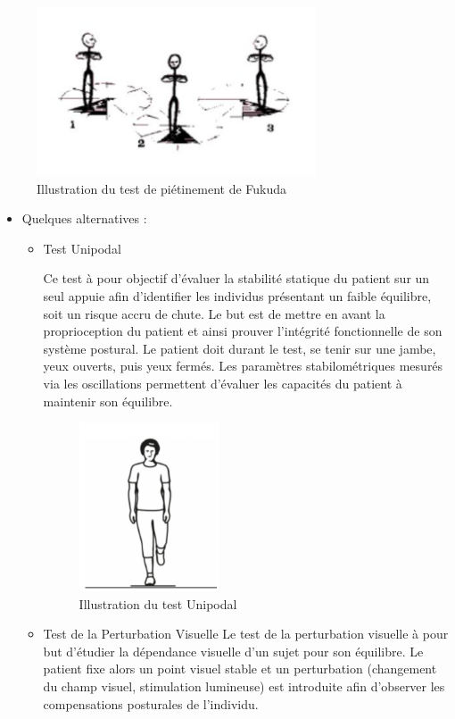 \begin{figure}[H]
    \centering
    \includegraphics[height=5cm]{images/Exam_cli/pietinement.png}
    \caption{Illustration du test de piétinement de Fukuda} 
    \label{fig:test_de_Fukuda}
\end{figure}



\begin{itemize}
    \item Quelques alternatives :
    \begin{itemize}
        \item Test Unipodal 
        
        Ce test à pour objectif d’évaluer la stabilité statique du patient sur un seul appuie  afin d’identifier les individus présentant un faible équilibre, soit un risque accru de chute. Le but est de mettre en avant la proprioception  du patient et ainsi prouver l’intégrité fonctionnelle de son système postural. Le patient doit durant le test, se tenir sur une jambe, yeux ouverts, puis yeux fermés. Les paramètres stabilométriques mesurés via les oscillations permettent d’évaluer les capacités du patient à maintenir son équilibre.

\begin{figure}[H]
    \centering
    \includegraphics[height=5cm]{images/Exam_cli/Unipodal.png}
    \caption{Illustration du test Unipodal} 
    \label{fig:test_de_Unipodal}
\end{figure}
        
        \item   Test de la Perturbation Visuelle 
        Le test de la perturbation visuelle à pour but d’étudier la dépendance visuelle d’un sujet pour son équilibre. Le patient fixe alors un point visuel stable et un perturbation (changement du champ visuel, stimulation lumineuse) est introduite afin d'observer les compensations posturales de l’individu. 
    \end{itemize}
\end{itemize}


